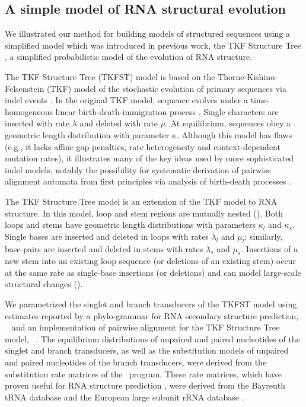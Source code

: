 \documentclass[10pt]{article}
\begin{document}
\subsection*{A simple model of RNA structural evolution}

We illustrated our method for building models of structured sequences
using a simplified model which was introduced in previous work,
the TKF Structure Tree \cite{Holmes2004}, a simplified probabilistic
model of the evolution of RNA structure.

The TKF Structure Tree (TKFST) model is based on the
Thorne-Kishino-Felsenstein (TKF) model of the stochastic evolution of
primary sequences via indel events \cite{ThorneEtal91}.  In the
original TKF model, sequence evolves under a time-homogeneous linear
birth-death-immigration process \cite{Kendall1948}.  Single characters
are inserted with rate $\lambda$ and deleted with rate $\mu$.  At
equilibrium, sequences obey a geometric length distribution with
parameter $\kappa$.  Although this model has flaws (e.g., it lacks
affine gap penalties, rate heterogeneity and context-dependent
mutation rates), it illustrates many of the key ideas used by more
sophisticated indel models, notably the possibility for systematic
derivation of pairwise alignment automata from first principles via
analysis of birth-death processes \cite{Feller71,ThorneEtal91}.

The TKF Structure Tree model is an extension of the TKF model to RNA
structure.  In this model, loop and stem regions are
mutually nested ().  Both loops and stems have geometric length
distributions with parameters $\kappa_l$ and $\kappa_s$.  Single bases
are inserted and deleted in loops with rates $\lambda_l$ and $\mu_l$;
similarly, base-pairs are inserted and deleted in stems with rates
$\lambda_s$ and $\mu_s$.  Insertions of a new stem into an existing
loop sequence (or deletions of an existing stem) occur at the same
rate as single-base insertions (or deletions) and can model
large-scale structural changes ().

We parametrized the singlet and branch transducers of the TKFST model
using estimates reported by a phylo-grammar for RNA secondary
structure prediction, \pfold\ \cite{KnudsenHein2003} and an
implementation of pairwise alignment for the TKF Structure Tree model,
\evoldoer\ \cite{Holmes2004}.
The equilibrium distributions of unpaired and paired nucleotides of
the singlet and branch transducers, as well as the substitution models
of unpaired and paired nucleotides of the branch transducers, were
derived from the substitution rate matrices of the \pfold\ program.
These rate matrices, which have proven useful for RNA structure
prediction \cite{KnudsenHein2003,DowellEddy2004,BradleyEtAl2008},
were derived from the Bayreuth tRNA database \cite{SprinzlEtAl1998}
and the European large subunit rRNA database \cite{DeRijkEtAl1998}.
\end{document}

